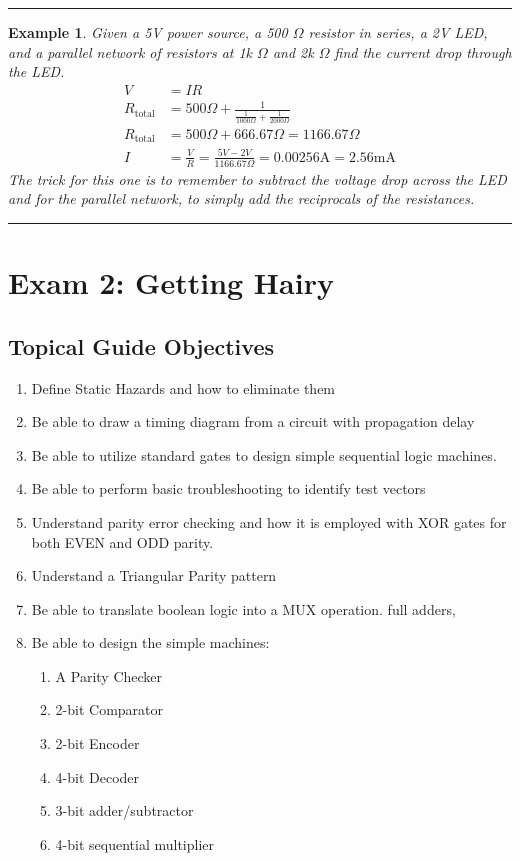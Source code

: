 \documentclass[12pt]{article}
\newtheorem{example}{Example}
\newenvironment{examp}
{
    \vspace{0.5cm}
    \hrule
    \begin{example}\upshape
}
{
    \end{example}
    \hrule
    \vspace{0.5cm}
}
\begin{document}
\begin{examp}

	Given a 5V power source, a 500 $\Omega$ resistor in series, a 2V LED, and a
	parallel network of resistors at 1k \(\Omega\) and 2k \(\Omega\) find the
	current drop through the LED.
	\begin{align*}
		V                & = IR                                                                               \\
		R_{\text{total}} & = 500 \Omega + \frac{1}{\frac{1}{1000 \Omega} + \frac{1}{2000\Omega}             } \\
		R_{\text{total}} & = 500 \Omega + 666.67 \Omega = 1166.67 \Omega                                      \\
		I                & = \frac{V}{R} = \frac{5V - 2V}{1166.67 \Omega} = 0.00256\text{A} = 2.56\text{mA}
	\end{align*}
	The trick for this one is to remember to subtract the voltage drop across the LED and
	for the parallel network, to simply add the reciprocals of the resistances.
\end{examp}
\section{Exam 2: Getting Hairy}
\subsection{Topical Guide Objectives}
\begin{enumerate}
	\item Define Static Hazards and how to eliminate them
	\item Be able to draw a timing diagram from a circuit with propagation
	      delay
	\item Be able to utilize standard gates to design simple sequential logic
	      machines.
	\item Be able to perform basic troubleshooting to identify test vectors
	\item Understand parity error checking and how it is employed with XOR
	      gates for both EVEN and ODD parity.
	\item Understand a Triangular Parity pattern
	\item Be able to translate boolean logic into a MUX operation.
	      full adders,
	\item Be able to design the simple machines:
	      \begin{enumerate}
		      \item A Parity Checker
		      \item 2-bit Comparator
		      \item 2-bit Encoder
		      \item 4-bit Decoder
		      \item 3-bit adder/subtractor
		      \item 4-bit sequential multiplier
	      \end{enumerate}
\end{enumerate}
\end{document}
